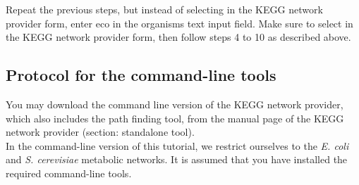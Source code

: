 Repeat the previous steps, but instead of selecting  in the KEGG network provider form, enter eco
in the organisms text input field. Make sure to select  in the KEGG network provider form,
then follow steps 4 to 10 as described above.

\subsection{Protocol for the command-line tools}

You may download the command line version of the KEGG network provider, which also includes the path finding tool,
from the manual page of the KEGG network provider (section: standalone tool). \\

In the command-line version of this tutorial, we restrict ourselves to the \textit{E. coli} and \textit{S. cerevisiae}
metabolic networks. It is assumed that you have installed the required command-line tools.

